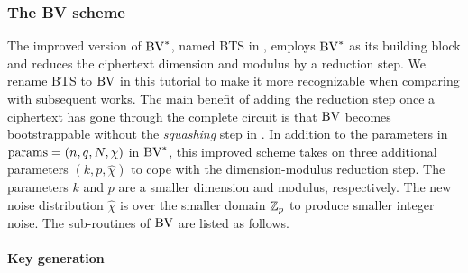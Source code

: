 \documentclass[../main.tex]{subfiles}
\begin{document}
\subsubsection{The BV scheme}

The improved version of $\text{BV}^*$, named BTS in \cite{brakerski2014efficient}, employs $\text{BV}^*$ as its building block and reduces the ciphertext dimension and modulus by a reduction step. We rename BTS to $\text{BV}$ in this tutorial to make it more recognizable when comparing with subsequent works. 
The main benefit of adding the reduction step once a ciphertext has gone through the complete circuit is that $\text{BV}$ becomes bootstrappable without the \textit{squashing} step %
in \cite{gentry2009fully}. 
In addition to the parameters in $\text{params}=(n,q,N,\chi)$ in $\text{BV}^*$, this improved scheme takes on three additional parameters $(k,p,\hat{\chi})$ to cope with the dimension-modulus reduction step. The parameters $k$ and $p$ are a smaller dimension and modulus, respectively. The new noise distribution $\hat{\chi}$ is over the smaller domain $\mathbb{Z}_p$ to produce smaller integer noise. The sub-routines of $\text{BV}$ are listed as follows. 

\paragraph{Key generation}
\end{document}
